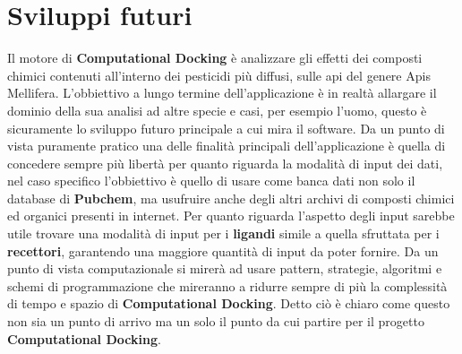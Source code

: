\section{Sviluppi futuri}
Il motore di \textbf{Computational Docking} è analizzare gli effetti dei composti chimici contenuti all'interno dei pesticidi più diffusi, sulle api del genere Apis Mellifera. L'obbiettivo a lungo termine dell'applicazione è in realtà allargare il dominio della sua analisi ad altre specie e casi, per esempio l'uomo, questo è sicuramente lo sviluppo futuro principale a cui mira il software.\newline
Da un punto di vista puramente pratico una delle finalità principali dell'applicazione è quella di concedere sempre più libertà per quanto riguarda la modalità di input dei dati, nel caso specifico l'obbiettivo è quello di usare come banca dati non solo il database di \textbf{Pubchem}, ma usufruire anche degli altri archivi di composti chimici ed organici presenti in internet. Per quanto riguarda l'aspetto degli input sarebbe utile trovare una modalità di input per i \textbf{ligandi} simile a quella sfruttata per i \textbf{recettori}, garantendo una maggiore quantità di input da poter fornire.\newline
Da un punto di vista computazionale si mirerà ad usare pattern, strategie, algoritmi e schemi di programmazione che mireranno a ridurre sempre di più la complessità di tempo e spazio di \textbf{Computational Docking}.\newline
Detto ciò è chiaro come questo non sia un punto di arrivo ma un solo il punto da cui partire per il progetto \textbf{Computational Docking}.










































